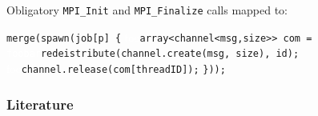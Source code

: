 \documentclass{beamer}
\begin{document}
\begin{frame}
Obligatory \texttt{MPI\_Init} and \texttt{MPI\_Finalize} calls mapped to:
\bigskip

\texttt{merge(spawn(job[p] \{}
\newline
\textcolor{white}{foo}\texttt{array<channel<msg,size>> com = \textcolor{white}{foobar}redeistribute(channel.create(msg, size), id);}
\newline
\textcolor{white}{foo}\texttt{channel.release(com[threadID]);}
\newline
\texttt{\}));}
\end{frame}


\begin{frame}[allowframebreaks]
\frametitle<presentation>{Literature}    
\printbibliography
\end{frame} 	 
\end{document}
